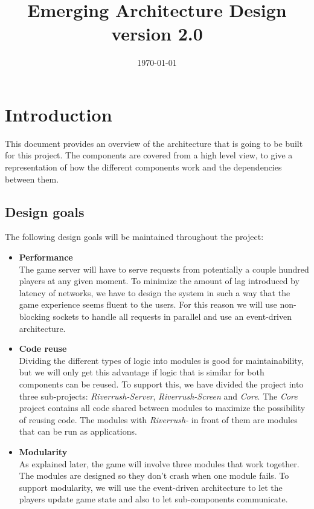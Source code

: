 \documentclass[11pt,a4paper]{article}
\begin{document}
\setlength{\droptitle}{-5em}
\title{
Emerging Architecture Design\\ 
version 2.0
}
\date{\today}
\maketitle

\section{Introduction}
This document provides an overview of the architecture that is going to be built for this project. The components are covered from a high level view, to give a representation of how the different components work and the dependencies between them.

\subsection{Design goals}
The following design goals will be maintained throughout the project:
\begin{itemize}
\item
\textbf{Performance}\\
The game server will have to serve requests from  potentially a couple hundred players at any given moment. To minimize the amount of lag introduced by latency of networks, we have to design the system in such a way that the game experience seems fluent to the users. For this reason we will use non-blocking sockets to handle all requests in parallel and use an event-driven architecture.

\item
\textbf{Code reuse}\\
Dividing the different types of logic into modules is good for maintainability, but we will only get this advantage if logic that is similar for both components can be reused. To support this, we have divided the project into three sub-projects: \emph{Riverrush-Server}, \emph{Riverrush-Screen} and \emph{Core}. The \emph{Core} project contains all code shared between modules to maximize the possibility of reusing code. The modules with \emph{Riverrush-} in front of them are modules that can be run as applications.

\item
\textbf{Modularity} \\
As explained later, the game will involve three modules that work together. The modules are designed so they don't crash when one module fails. To support modularity, we will use the event-driven architecture to let the players update game state and also to let sub-components communicate.

\end{itemize}
\end{document}
